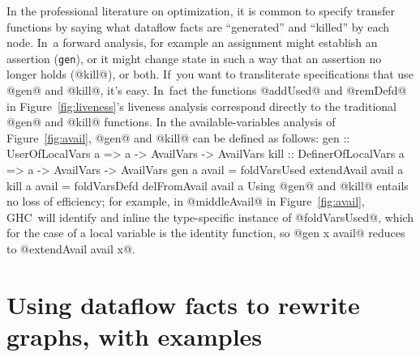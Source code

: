 \documentclass[blockstyle,preprint,nocopyrightspace]{sigplanconf}
\newenvironment{smallcode}{\small\verbatim}{\endverbatim}
\newcommand\seclabel[1]{\label{sec:#1}}
\newcommand\figref[1]{Figure~\ref{fig:#1}}
\begin{document}
In the professional literature on optimization, it is common to specify
transfer functions by saying what dataflow facts are ``generated'' and
``killed'' by each node.
In~a forward analysis, for example an assignment might establish an
assertion (\texttt{gen}), or it might change state in such a way that an
assertion no longer holds (@kill@), or both.
If~you want to transliterate specifications that use @gen@ and @kill@,
it's easy.
In~fact the functions @addUsed@ and @remDefd@ in \figref{liveness}'s
liveness analysis correspond directly to the traditional @gen@ and
@kill@ functions.
In the available-variables analysis of \figref{avail}, @gen@ and
@kill@ can be defined as follows:
\begin{smallcode}
gen  :: UserOfLocalVars    a => a -> AvailVars -> AvailVars
kill :: DefinerOfLocalVars a => a -> AvailVars -> AvailVars
gen  a avail = foldVarsUsed extendAvail  avail a
kill a avail = foldVarsDefd delFromAvail avail a
\end{smallcode}
Using @gen@ and @kill@ entails no loss of efficiency;
for example, in @middleAvail@ in \figref{avail}, GHC~will identify and
inline the type-specific instance of @foldVarsUsed@, which for the
case of a local variable is the identity function, so @gen x avail@
reduces to @extendAvail avail x@.



\section{Using dataflow facts to rewrite graphs, with examples}

\seclabel{example-rewrites}
\end{document}
